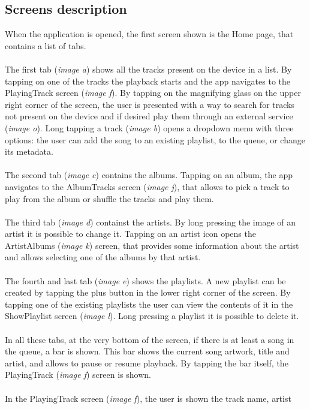 \documentclass{article}
\begin{document}
\subsection{Screens description}
When the application is opened, the first screen shown is the Home page, that
contains a list of tabs.
\\\\
The first tab (\textit{image a}) shows all the tracks present on the device in a list. By
tapping on one of the tracks the playback starts and the app navigates to the
PlayingTrack screen (\textit{image f}). By tapping on the magnifying
glass on the upper right corner of the screen, the user is presented with a way
to search for tracks not present on the device and if desired play them through
an external service (\textit{image o}). Long tapping a track (\textit{image b}) opens
a dropdown menu with three options: the user can add the song to an existing
playlist, to the queue, or change its metadata.
\\\\
The second tab (\textit{image c}) contains the albums. Tapping on an album, the app
navigates to the AlbumTracks screen (\textit{image j}), that allows to pick a track to
play from the album or shuffle the tracks and play them.
\\\\
The third tab (\textit{image d}) containst the artists.  By long pressing the image of an
artist it is possible to change it. Tapping on an artist icon opens the
ArtistAlbums (\textit{image k}) screen, that provides some information about the artist
and allows selecting one of the albums by that artist.
\\\\
The fourth and last tab (\textit{image e}) shows the playlists. A new playlist can be
created by tapping the plus button in the lower right corner of the screen. By
tapping one of the existing playlists the user can view the contents of it in
the ShowPlaylist screen (\textit{image l}). Long pressing a playlist it is possible to
delete it.
\\\\
In all these tabs, at the very bottom of the screen, if there is at least a song
in the queue, a bar is shown. This bar shows the current song artwork, title and
artist, and allows to pause or resume playback. By tapping the bar itself, the
PlayingTrack (\textit{image f}) screen is shown.
\\\\
In the PlayingTrack screen (\textit{image f}), the user is shown the track name, artist
\end{document}
